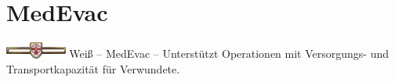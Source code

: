 \section{MedEvac}
\includegraphics[width=20mm]{../img/truppenordnung/logistikMedevac/weiss}\linebreak
Weiß -- \acf{MedEvac} -- Unterstützt Operationen mit Versorgungs- und Transportkapazität für Verwundete.